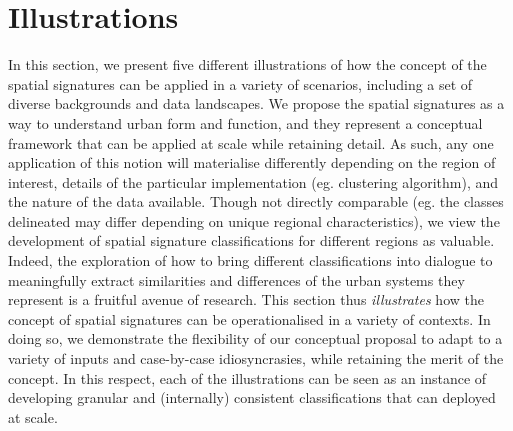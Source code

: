 \section{Illustrations}
\label{sec:app}



In this section, we present five different illustrations of how the concept of the spatial
signatures can be applied in a variety of scenarios, including a set of diverse
backgrounds and data landscapes.
We propose the spatial signatures as a way to understand urban form and
function, and they represent a conceptual framework that can be applied at
scale while retaining detail.
As such, any one application of this notion will materialise differently depending
on the region of interest, details of the particular implementation (eg. clustering algorithm),
and the nature of the data available.
%
Though not directly comparable (eg. the classes delineated may differ depending on unique
regional characteristics), we view the development of spatial signature classifications for
different regions as valuable. Indeed, the exploration of how to bring
different classifications into dialogue to meaningfully extract similarities
and differences of the urban systems they represent is a fruitful avenue of research.
This section thus \textit{illustrates} how the concept of
spatial signatures can be operationalised in a variety of contexts.
In doing so, we demonstrate the flexibility of our conceptual proposal to adapt to
a variety of inputs and case-by-case idiosyncrasies, while retaining the merit of
the concept.
%
In this respect, each of the illustrations can be seen as an instance of developing
granular and (internally) consistent classifications that can deployed at scale.

